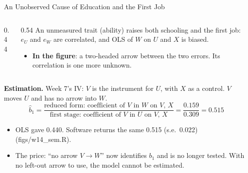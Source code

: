 \documentclass[aspectratio=169,11pt,xcolor=dvipsnames]{beamer}
\newcommand{\srcp}[1]{{\scriptsize\color{gray}(#1)}}
\begin{document}
\begin{frame}{An Unobserved Cause of Education and the First Job}
\begin{columns}[c]
\begin{column}{0.44\linewidth}
\centering
{}
\end{column}
\begin{column}{0.54\linewidth}
An unmeasured trait (ability) raises both schooling and the first job: $e_U$ and $e_W$ are
correlated, and OLS of $W$ on $U$ and $X$ is biased.
\begin{itemize}\itemsep3pt
  \item \textbf{In the figure}: a two-headed arrow between the two errors. Its correlation is
        one more unknown.
\end{itemize}
\end{column}
\end{columns}
\vskip5pt
\textbf{Estimation.} Week 7's IV: $V$ is the instrument for $U$, with $X$ as a control. $V$ moves
$U$ and has no arrow into $W$.
\vskip-8pt
\[ \hat b_1 = \frac{\text{reduced form: coefficient of $V$ in $W$ on $V$, $X$}}
                   {\text{first stage: coefficient of $V$ in $U$ on $V$, $X$}}
   = \frac{0.159}{0.309} = 0.515 \]
\vskip-6pt
\begin{itemize}\itemsep2pt
  \item OLS gave 0.440. Software returns the same 0.515 (s.e.\ 0.022) \srcp{figs/w14\_sem.R}.
  \item The price: ``no arrow $V \to W$'' now identifies $b_1$ and is no longer tested. With no
        left-out arrow to use, the model cannot be estimated.
\end{itemize}
\end{frame}
\end{document}
